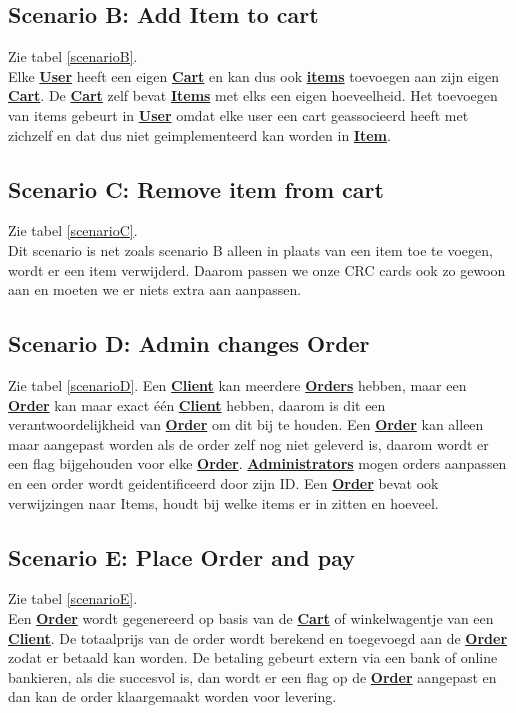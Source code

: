 \documentclass[•]{article}
\begin{document}
\subsection{Scenario B: Add Item to cart}
Zie tabel \ref{scenarioB}.\\
Elke \textbf{\underline{User}} heeft een eigen \textbf{\underline{Cart}} en kan dus ook \textbf{\underline{items}} toevoegen aan zijn eigen \textbf{\underline{Cart}}. De \textbf{\underline{Cart}} zelf bevat \textbf{\underline{Items}} met elks een eigen hoeveelheid. Het toevoegen van items gebeurt in \textbf{\underline{User}} omdat elke user een cart geassocieerd heeft met zichzelf en dat dus niet geimplementeerd kan worden in \textbf{\underline{Item}}.

\subsection{Scenario C: Remove item from cart}
Zie tabel \ref{scenarioC}.\\
Dit scenario is net zoals scenario B alleen in plaats van een item toe te voegen, wordt er een item verwijderd. Daarom passen we onze CRC cards ook zo gewoon aan en moeten we er niets extra aan aanpassen.

\subsection{Scenario D: Admin changes Order}
Zie tabel \ref{scenarioD}.
Een \textbf{\underline{Client}} kan meerdere \textbf{\underline{Orders}} hebben, maar een \textbf{\underline{Order}} kan maar exact \'e\'en \textbf{\underline{Client}} hebben, daarom is dit een verantwoordelijkheid van \textbf{\underline{Order}} om dit bij te houden. Een \textbf{\underline{Order}} kan alleen maar aangepast worden als de order zelf nog niet geleverd is, daarom wordt er een flag bijgehouden voor elke \textbf{\underline{Order}}. \textbf{\underline{Administrators}} mogen orders aanpassen en een order wordt geidentificeerd door zijn ID. Een \textbf{\underline{Order}} bevat ook verwijzingen naar Items, houdt bij welke items er in zitten en hoeveel.

\subsection{Scenario E: Place Order and pay}
Zie tabel \ref{scenarioE}.\\
Een \textbf{\underline{Order}} wordt gegenereerd op basis van de \textbf{\underline{Cart}} of winkelwagentje van een \textbf{\underline{Client}}. De totaalprijs van de order wordt berekend en toegevoegd aan de \textbf{\underline{Order}} zodat er betaald kan worden. De betaling gebeurt extern via een bank of online bankieren, als die succesvol is, dan wordt er een flag op de \textbf{\underline{Order}} aangepast en dan kan de order klaargemaakt worden voor levering. 
\end{document}
